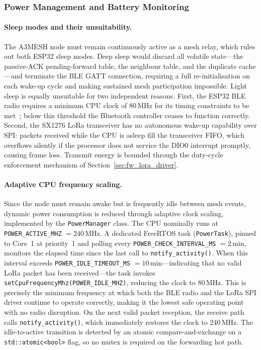 \documentclass[english,bachelor]{tfgitic}[2026/01/22]
\begin{document}
\subsubsection{Power Management and Battery Monitoring}
\label{sec:fw_power}

\paragraph{Sleep modes and their unsuitability.}
The A3MESH node must remain continuously active as a mesh relay, which rules out both
ESP32 sleep modes. Deep sleep would discard all volatile state---the passive-ACK
pending-forward table, the neighbour table, and the duplicate cache---and terminate
the BLE GATT connection, requiring a full re-initialisation on each wake-up cycle and
making sustained mesh participation impossible. Light sleep is equally unsuitable for
two independent reasons. First, the ESP32 BLE radio requires a minimum CPU clock of
80\,MHz for its timing constraints to be met~\cite{espressif2023esp32trm}; below this
threshold the Bluetooth controller ceases to function correctly. Second, the SX1276
LoRa transceiver has no autonomous wake-up capability over SPI: packets received
while the CPU is asleep fill the transceiver FIFO, which overflows silently if the
processor does not service the DIO0 interrupt promptly, causing frame loss. Transmit
energy is bounded through the duty-cycle enforcement mechanism of
Section~\ref{sec:fw_lora_driver}.

\paragraph{Adaptive CPU frequency scaling.}
Since the node must remain awake but is frequently idle between mesh events, dynamic
power consumption is reduced through adaptive clock scaling, implemented by the
\texttt{PowerManager} class. The CPU nominally runs at \texttt{POWER\_ACTIVE\_MHZ}
$= 240$\,MHz. A dedicated FreeRTOS task (\texttt{PowerTask}), pinned to Core~1 at
priority~1 and polling every \texttt{POWER\_CHECK\_INTERVAL\_MS} $= 2$\,min, monitors
the elapsed time since the last call to \texttt{notify\_activity()}. When this
interval exceeds \texttt{POWER\_IDLE\_TIMEOUT\_MS} $= 10$\,min---indicating that no
valid LoRa packet has been received---the task invokes
\texttt{setCpuFrequencyMhz(POWER\_IDLE\_MHZ)}, reducing the clock to 80\,MHz. This
is precisely the minimum frequency at which both the BLE radio and the LoRa SPI
driver continue to operate correctly, making it the lowest safe operating point with
no radio disruption. On the next valid packet reception, the receive path calls
\texttt{notify\_activity()}, which immediately restores the clock to 240\,MHz. The
idle-to-active transition is detected by an atomic compare-and-exchange on a
\texttt{std::atomic<bool>} flag, so no mutex is required on the forwarding hot path.
\end{document}
